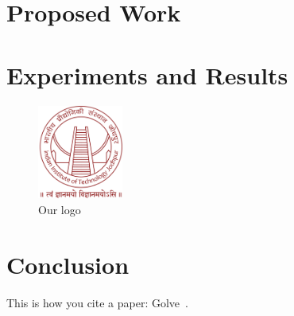 \section{Proposed Work}
\clearpage
\section{Experiments and Results}
\begin{figure}[h]
    \centering
    \includegraphics[width=0.25\textwidth]{Figures/IITJlogo.jpg}
    \caption{\label{fig:myfig1}Our logo}
    
\end{figure}
\clearpage
\section{Conclusion}
This is how you cite a paper: Golve~\cite{glove:2014}.
